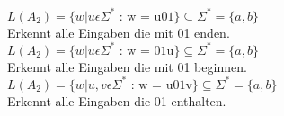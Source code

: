 $L(A_2) = \{w| u \epsilon \Sigma^* \textrm{ : w = u01}\} \subseteq \Sigma^* = \{ a, b\}$\\
Erkennt alle Eingaben die mit 01 enden.\\

$L(A_2) = \{w| u \epsilon \Sigma^* \textrm{ : w = 01u}\} \subseteq \Sigma^* = \{ a, b\}$\\
Erkennt alle Eingaben die mit 01 beginnen.\\

$L(A_2) = \{w| u,v \epsilon \Sigma^* \textrm{ : w = u01v}\} \subseteq \Sigma^* = \{ a, b\}$\\
Erkennt alle Eingaben die 01 enthalten.\\
